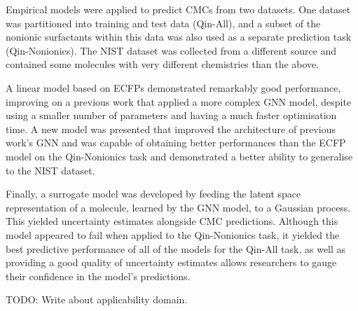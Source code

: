 Empirical models were applied to predict CMCs from two datasets. One dataset was partitioned into training and test data (Qin-All), and a subset of the nonionic surfactants within this data was also used as a separate prediction task
(Qin-Nonionics). The NIST dataset was collected from a different source and contained some molecules with very different chemistries than the above.

A linear model based on ECFPs demonstrated remarkably good performance, improving on a previous work \cite{qinPredictingCriticalMicelle2021} that applied a more complex GNN model, despite using a smaller number of parameters and having a much faster optimisation time. A new model was presented that improved the architecture of previous work's GNN and was capable of obtaining better performances than the ECFP model on the Qin-Nonionics task and
demonstrated a better ability to generalise to the NIST dataset.

Finally, a surrogate model was developed by feeding the latent space representation of a molecule, learned by the GNN model, to a Gaussian process.
This yielded uncertainty estimates alongside CMC predictions. Although this model appeared to fail when applied to the Qin-Nonionics task, it yielded the best predictive performance of all of the models for the Qin-All task, as well as
providing a good quality of uncertainty estimates allows researchers to gauge their confidence in the model's predictions.

TODO: Write about applicability domain.